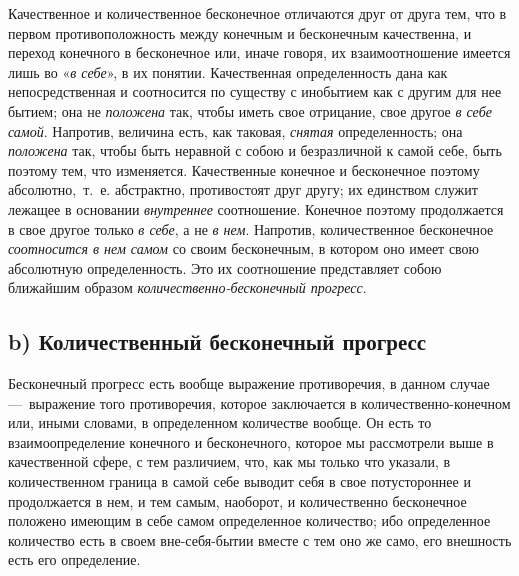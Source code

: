 Качественное и количественное бесконечное отличаются друг от друга тем, что
в первом противоположность между конечным и бесконечным качественна, и
переход конечного в бесконечное или, иначе говоря, их взаимоотношение
имеется лишь во «{\em в себе}», в их понятии.
Качественная определенность дана как непосредственная и соотносится по
существу с инобытием как с другим для нее бытием; она не
{\em положена} так, чтобы иметь свое отрицание, свое
другое {\em в себе самой}. Напротив, величина есть, как
таковая, {\em снятая} определенность; она
{\em положена} так, чтобы быть неравной с собою и
безразличной к самой себе, быть поэтому тем, что изменяется. Качественные
конечное и бесконечное поэтому абсолютно,~т.~е. абстрактно, противостоят
друг другу; их единством служит лежащее в основании
{\em внутреннее} соотношение. Конечное поэтому
продолжается в свое другое только {\em в себе}, а не
{\em в нем}. Напротив, количественное бесконечное
{\em соотносится в нем самом} со своим бесконечным, в
котором оно имеет свою абсолютную определенность. Это их соотношение
представляет собою ближайшим образом
{\em количественно-бесконечный прогресс}.


\subsection[b) Количественный бесконечный прогресс]{b) Количественный бесконечный прогресс}

Бесконечный прогресс есть вообще выражение противоречия, в данном случае
—~выражение того противоречия, которое заключается в количественно-конечном
или, иными словами, в определенном количестве вообще. Он есть то
взаимоопределение конечного и бесконечного, которое мы рассмотрели выше в
качественной сфере, с тем различием, что, как мы только что указали, в
количественном граница в самой себе выводит себя в свое потустороннее и
продолжается в нем, и тем самым, наоборот, и количественно бесконечное
положено имеющим в себе самом определенное количество; ибо определенное
количество есть в своем вне-себя-бытии вместе с тем оно же само, его
внешность есть его определение.

